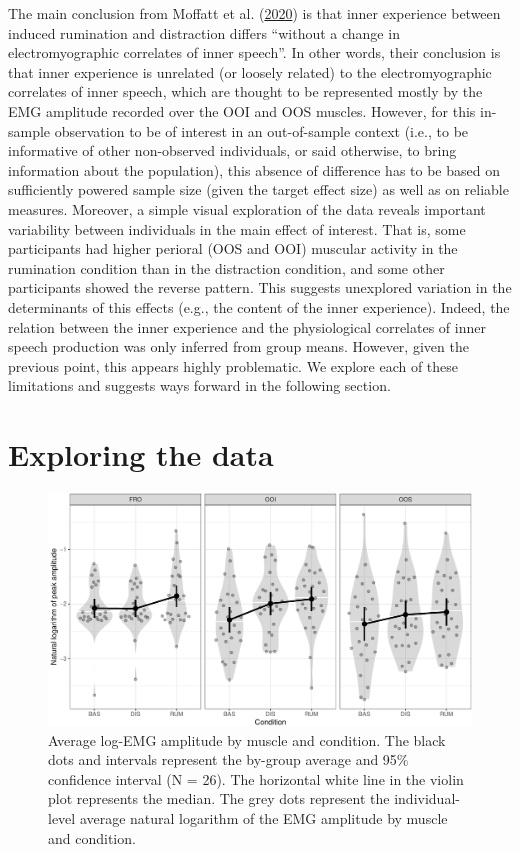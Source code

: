 \documentclass[
  english,
  man,floatsintext]{apa6}
\begin{document}
The main conclusion from Moffatt et al. (\protect\hyperlink{ref-moffatt_inner_2020}{2020}) is that inner experience between induced rumination and distraction differs ``without a change in electromyographic correlates of inner speech''. In other words, their conclusion is that inner experience is unrelated (or loosely related) to the electromyographic correlates of inner speech, which are thought to be represented mostly by the EMG amplitude recorded over the OOI and OOS muscles. However, for this in-sample observation to be of interest in an out-of-sample context (i.e., to be informative of other non-observed individuals, or said otherwise, to bring information about the population), this absence of difference has to be based on sufficiently powered sample size (given the target effect size) as well as on reliable measures. Moreover, a simple visual exploration of the data reveals important variability between individuals in the main effect of interest. That is, some participants had higher perioral (OOS and OOI) muscular activity in the rumination condition than in the distraction condition, and some other participants showed the reverse pattern. This suggests unexplored variation in the determinants of this effects (e.g., the content of the inner experience). Indeed, the relation between the inner experience and the physiological correlates of inner speech production was only inferred from group means. However, given the previous point, this appears highly problematic. We explore each of these limitations and suggests ways forward in the following section.

\hypertarget{exploring-the-data}{%
\section{Exploring the data}\label{exploring-the-data}}

\begin{figure}[!htb]

{\centering \includegraphics[width=1\linewidth]{manuscript_files/figure-latex/general-1} 

}

\caption{Average log-EMG amplitude by muscle and condition. The black dots and intervals represent the by-group average and 95\% confidence interval (N = 26). The horizontal white line in the violin plot represents the median. The grey dots represent the individual-level average natural logarithm of the EMG amplitude by muscle and condition.}\label{fig:general}
\end{figure}
\end{document}
